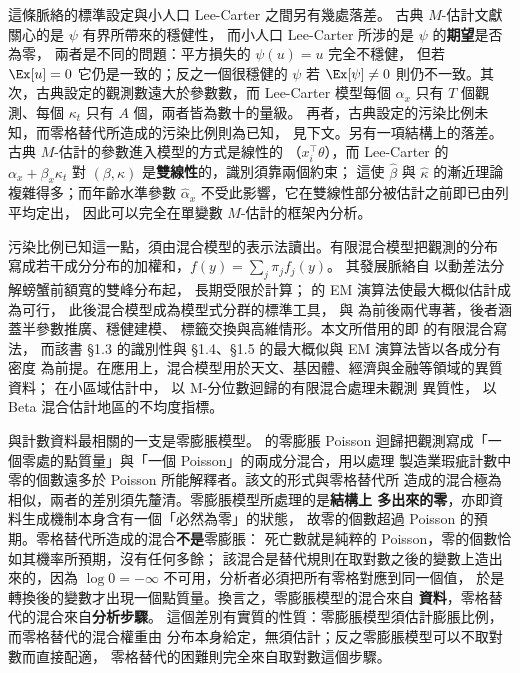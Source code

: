這條脈絡的標準設定與小人口 Lee-Carter 之間另有幾處落差。
古典 $M$-估計文獻關心的是 $\psi$ 有界所帶來的穩健性，
而小人口 Lee-Carter 所涉的是 $\psi$ 的\textbf{期望}是否為零，
兩者是不同的問題：平方損失的 $\psi(u)=u$ 完全不穩健，
但若 $\Ex[u]=0$ 它仍是一致的；反之一個很穩健的 $\psi$ 若 $\Ex[\psi]\ne0$
則仍不一致。其次，古典設定的觀測數遠大於參數數，而 Lee-Carter 模型每個
$\alpha_x$ 只有 $T$ 個觀測、每個 $\kappa_t$ 只有 $A$ 個，兩者皆為數十的量級。
再者，古典設定的污染比例未知，而零格替代所造成的污染比例則為已知，
見下文。另有一項結構上的落差。古典 $M$-估計的參數進入模型的方式是線性的
（$x_i^{\top}\theta$），而 Lee-Carter 的 $\alpha_x+\beta_x\kappa_t$ 對
$(\beta,\kappa)$ 是\textbf{雙線性}的，識別須靠兩個約束；
這使 $\hat\beta$ 與 $\hat\kappa$ 的漸近理論複雜得多；而年齡水準參數
$\hat\alpha_x$ 不受此影響，它在雙線性部分被估計之前即已由列平均定出，
因此可以完全在單變數 $M$-估計的框架內分析。

污染比例已知這一點，須由混合模型的表示法讀出。有限混合模型把觀測的分布
寫成若干成分分布的加權和，$f(y)=\sum_{j}\pi_j f_j(y)$。
其發展脈絡自 \citet{pearson1894} 以動差法分解螃蟹前額寬的雙峰分布起，
長期受限於計算；\citet{dempster1977} 的 EM 演算法使最大概似估計成為可行，
此後混合模型成為模型式分群的標準工具，\citet{mclachlan2000} 與
\citet{yao2024} 為前後兩代專著，後者涵蓋半參數推廣、穩健建模、
標籤交換與高維情形。本文所借用的即 \citet[§1.2]{yao2024} 的有限混合寫法，
而該書 §1.3 的識別性與 §1.4、§1.5 的最大概似與 EM 演算法皆以各成分有密度
為前提。在應用上，混合模型用於天文、基因體、經濟與金融等領域的異質資料；
在小區域估計中，\citet{delsarto2019} 以 M-分位數迴歸的有限混合處理未觀測
異質性，\citet{denicolo2023} 以 Beta 混合估計地區的不均度指標。

與計數資料最相關的一支是零膨脹模型。\citet{lambert1992} 的零膨脹 Poisson
迴歸把觀測寫成「一個零處的點質量」與「一個 Poisson」的兩成分混合，用以處理
製造業瑕疵計數中零的個數遠多於 Poisson 所能解釋者。該文的形式與零格替代所
造成的混合極為相似，兩者的差別須先釐清。零膨脹模型所處理的是\textbf{結構上
多出來的零}，亦即資料生成機制本身含有一個「必然為零」的狀態，
故零的個數超過 Poisson 的預期。零格替代所造成的混合\textbf{不是}零膨脹：
死亡數就是純粹的 Poisson，零的個數恰如其機率所預期，沒有任何多餘；
該混合是替代規則在取對數之後的變數上造出來的，因為 $\log 0=-\infty$
不可用，分析者必須把所有零格對應到同一個值，
於是轉換後的變數才出現一個點質量。換言之，零膨脹模型的混合來自
\textbf{資料}，零格替代的混合來自\textbf{分析步驟}。
這個差別有實質的性質：零膨脹模型須估計膨脹比例，而零格替代的混合權重由
分布本身給定，無須估計；反之零膨脹模型可以不取對數而直接配適，
零格替代的困難則完全來自取對數這個步驟。


